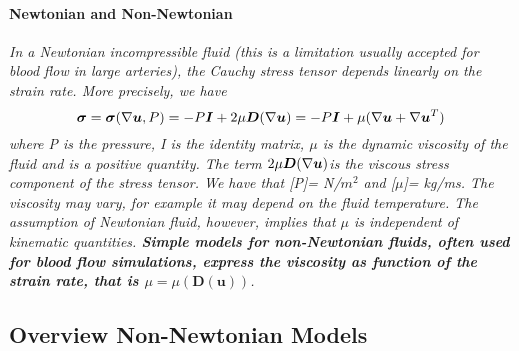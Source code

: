 \documentclass[11pt,letterpaper]{article}
\begin{document}
\paragraph{Newtonian and Non-Newtonian}
\textit{ In a Newtonian incompressible fluid (this is a limitation usually accepted for blood flow in large arteries), the Cauchy stress tensor depends
linearly on the strain rate. More precisely, we have \begin{equation}
    \bm{\sigma} = \bm{\sigma}(\nabla\bm{u},P)= -P\bm{I} +2\mu\bm{D}(\nabla\bm{u})= -P\bm{I} + \mu(\nabla\bm{u}+\nabla\bm{u}^T)
\end{equation}
where P is the pressure, I is the identity matrix, $\mu$ is the dynamic viscosity of the fluid and is a positive quantity. The term $2\mu\bm{D}(\nabla\bm{u})$is the viscous stress component of the stress tensor. We
have that [P]= N/$m^2$ and [$\mu$]= kg/ms. The viscosity may vary, for example it may depend on the fluid temperature. The assumption of Newtonian fluid, however, implies that $\mu$ is independent of kinematic quantities. \textbf{Simple models for non-Newtonian fluids, often used for blood flow simulations, express the viscosity as function of the strain rate, that is $\mu = \mu(\bm{D}(\bm{u}))$}. }

\newpage
\subsection*{Overview Non-Newtonian Models
}


\newpage
\end{document}
